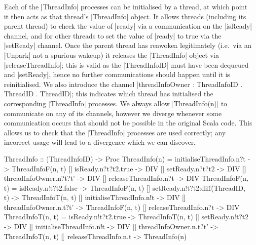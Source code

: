 Each of the |ThreadInfo| processes can be initialised by a thread, at which point it then acts as that thread's |ThreadInfo| object. It allows threads (including its parent thread) to check the value of |ready| via a communication on the |isReady| channel, and for other threads to set the value of |ready| to true via the |setReady| channel. Once the parent thread has reawoken legitimately (i.e.~via an |Unpark| not a spurious wakeup) it releases the |ThreadInfo| object via |releaseThreadInfo|; this is valid as the |ThreadInfoID| must have  been dequeued and |setReady|, hence no further communications should happen until it is reinitialised. We also introduce the channel |threadInfoOwner : ThreadInfoID . ThreadID . ThreadID|; this indicates which thread has initialised the corresponding |ThreadInfo| processes.
We always allow |ThreadInfo(n)| to communicate on any of its channels, however we diverge whenever some communication occurs that should not be possible in the original Scala code. This allows us to check that the |ThreadInfo| processes are used correctly; any incorrect usage will lead to a divergence which we can discover.

\begin{cspm}[caption={The definition of a {\scalastyle ThreadInfo} process}]
ThreadInfo :: (ThreadInfoID) -> Proc
ThreadInfo(n) = 
      initialiseThreadInfo.n?t -> ThreadInfoF(n, t)
  [] isReady.n?t?t2.true -> DIV
  [] setReady.n?t?t2 -> DIV
  [] threadInfoOwner.n?t?t' -> DIV
  [] releaseThreadInfo.n?t -> DIV
ThreadInfoF(n, t) =  
      isReady.n!t?t2.false -> ThreadInfoF(n, t)
  [] setReady.n!t?t2:diff(ThreadID, t) -> ThreadInfoT(n, t)
  [] initialiseThreadInfo.n!t -> DIV
  [] threadInfoOwner.n.t?t' -> ThreadInfoF(n, t)
  [] releaseThreadInfo.n?t -> DIV
ThreadInfoT(n, t) = 
      isReady.n!t?t2.true -> ThreadInfoT(n, t)
  [] setReady.n!t?t2 -> DIV
  [] initialiseThreadInfo.n!t -> DIV
  [] threadInfoOwner.n.t?t' -> ThreadInfoT(n, t)
  [] releaseThreadInfo.n.t -> ThreadInfo(n)
\end{cspm}

